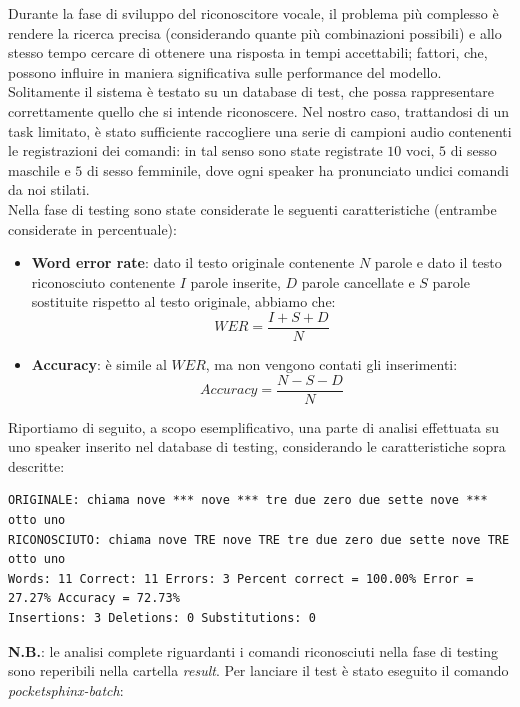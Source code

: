 \documentclass[12pt]{article}
\begin{document}
Durante la fase di sviluppo del riconoscitore vocale, il problema più complesso è rendere la ricerca precisa (considerando quante più combinazioni possibili) e allo stesso tempo cercare di ottenere una risposta in tempi accettabili; fattori, che, possono influire in maniera significativa sulle performance del modello.
Solitamente il sistema è testato su un database di test, che possa rappresentare correttamente quello che si intende riconoscere.
Nel nostro caso, trattandosi di un task limitato, è stato sufficiente raccogliere una serie di campioni audio contenenti le registrazioni dei comandi: in tal senso sono state registrate $10$ voci, $5$ di sesso maschile e $5$ di sesso femminile, dove ogni speaker ha pronunciato undici comandi da noi stilati.\\
Nella fase di testing sono state considerate le seguenti caratteristiche (entrambe considerate in percentuale):
\begin{itemize}
    \item \textbf{Word error rate}: dato il testo originale contenente $N$ parole e dato il testo riconosciuto contenente $I$ parole inserite, $D$ parole cancellate e $S$ parole sostituite rispetto al testo originale, abbiamo che:
    \begin{equation}
        WER = \frac{I+S+D}{N}
    \end{equation}
    \item \textbf{Accuracy}: è simile al $WER$, ma non vengono contati gli inserimenti:
     \begin{equation}
        Accuracy = \frac{N-S-D}{N}
    \end{equation}
\end{itemize}
Riportiamo di seguito, a scopo esemplificativo, una parte di analisi effettuata su uno speaker inserito nel database di testing, considerando le caratteristiche sopra descritte:

 \begin{lstlisting}
ORIGINALE: chiama nove *** nove *** tre due zero due sette nove *** otto uno  
RICONOSCIUTO: chiama nove TRE nove TRE tre due zero due sette nove TRE otto uno  
Words: 11 Correct: 11 Errors: 3 Percent correct = 100.00% Error = 27.27% Accuracy = 72.73%
Insertions: 3 Deletions: 0 Substitutions: 0
  \end{lstlisting}
\textbf{N.B.}: le analisi complete riguardanti i comandi riconosciuti nella fase di testing sono reperibili nella cartella \textit{result}. 
Per lanciare il test è stato eseguito il comando \textit{pocketsphinx-batch}:
\end{document}
